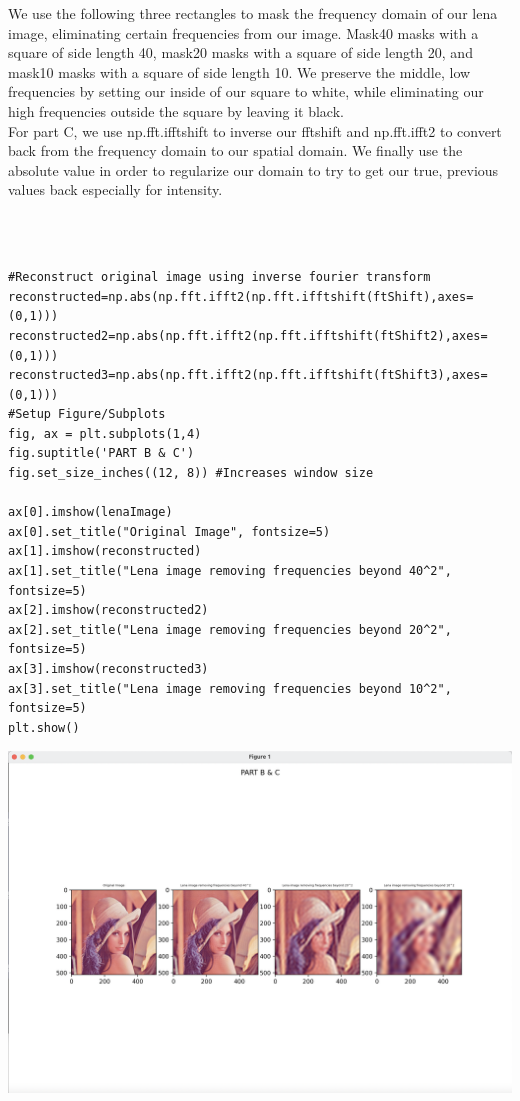 \documentclass[12pt]{article}
\begin{document}
\noindent We use the following three rectangles to mask the frequency domain of our lena image, eliminating certain frequencies from our image. Mask40 masks with a square of side length 40, mask20 masks with a square of side length 20, and mask10 masks with a square of side length 10. We preserve the middle, low frequencies by setting our inside of our square to white, while eliminating our high frequencies outside the square by leaving it black.\\

\noindent For part C, we use np.fft.ifftshift to inverse our fftshift and np.fft.ifft2 to convert back from the frequency domain to our spatial domain. We finally use the absolute value in order to regularize our domain to try to get our true, previous values back especially for intensity.

\pagebreak\\\\
\begin{mdframed}[backgroundcolor=bg]
\begin{verbatim}
#Reconstruct original image using inverse fourier transform
reconstructed=np.abs(np.fft.ifft2(np.fft.ifftshift(ftShift),axes=(0,1))) 
reconstructed2=np.abs(np.fft.ifft2(np.fft.ifftshift(ftShift2),axes=(0,1))) 
reconstructed3=np.abs(np.fft.ifft2(np.fft.ifftshift(ftShift3),axes=(0,1))) 
#Setup Figure/Subplots
fig, ax = plt.subplots(1,4)
fig.suptitle('PART B & C')
fig.set_size_inches((12, 8)) #Increases window size

ax[0].imshow(lenaImage)
ax[0].set_title("Original Image", fontsize=5)
ax[1].imshow(reconstructed)
ax[1].set_title("Lena image removing frequencies beyond 40^2", fontsize=5)
ax[2].imshow(reconstructed2)
ax[2].set_title("Lena image removing frequencies beyond 20^2", fontsize=5)
ax[3].imshow(reconstructed3)
ax[3].set_title("Lena image removing frequencies beyond 10^2", fontsize=5)
plt.show()
\end{verbatim}
\end{mdframed}
\includegraphics[scale=0.38]{2B&C.png}\\
\end{document}
